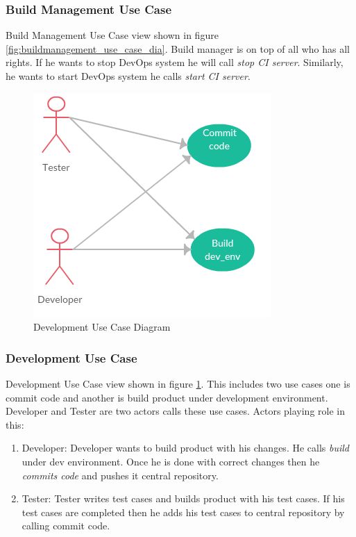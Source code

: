 \documentclass[a4paper,oneside,1,english1pt]{report}
\begin{document}
\subsubsection{Build Management Use Case}
Build Management Use Case view shown in figure \ref{fig:buildmanagement_use_case_dia}. Build manager is on top of all who has all rights. If he wants to stop DevOps system he will call \textit{stop \ac{CI} server}. Similarly, he wants to start DevOps system he calls \textit{start \ac{CI} server}.

\begin{figure}[h]
	\includegraphics[width=\linewidth]{diagrams/DevelopmentUseCase.png}
	\caption{Development Use Case Diagram}
	\label{fig:development_use_case_dia}
\end{figure}
\subsubsection{Development Use Case}
	Development Use Case view shown in figure \ref{fig:development_use_case_dia}. This includes two use cases one is commit code and another is build product under development environment. Developer and Tester are two actors calls these use cases.
	Actors playing role in this:
	\begin{enumerate}
		\item Developer: Developer wants to build product with his changes. He calls \textit{build } under dev environment. Once he is done with correct changes then he \textit{commits code} and pushes it central repository.
		\item Tester: Tester writes test cases and builds product with his test cases. If his test cases are completed  then he adds his test cases to central repository by calling commit code.
	\end{enumerate}
\end{document}
